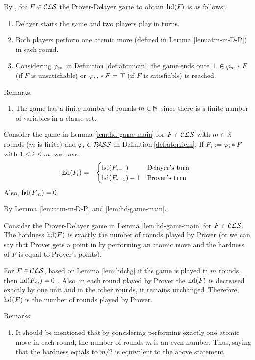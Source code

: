 \documentclass{report}
\begin{document}
\begin{lem}\label{lem:hd-game-main}
By \cite{BeyersdorffKullmann2014PHP}, for $F \in \mathcal{CLS}$ the Prover-Delayer game to obtain $\operatorname{hd}(F)$ is as follows:
  \begin{enumerate}
  \item Delayer starts the game and two players play in turns.
  \item Both players perform one atomic move (defined in Lemma \ref{lem:atm-m-D-P}) in each round.
  \item Considering $\varphi_m$ in Definition \ref{def:atomicm}, the game ends once $\bot \in \varphi_m * F $ (if $F$ is unsatisfiable) or $\varphi_m * F=\top$ (if $F$ is satisfiable) is reached. 
  \end{enumerate}
\end{lem}
Remarks:
  \begin{enumerate}
  \item The game has a finite number of rounds $m \in \mathbb{N}$ since there is a finite number of variables in a clause-set. 
  \end{enumerate}

\begin{lem}\label{lem:hdchg}
Consider the game in Lemma \ref{lem:hd-game-main} for $F \in \mathcal{CLS}$ with $m \in  \mathbb{N}$ rounds ($m$ is finite) and $\varphi_i \in \mathcal{P\hspace{-0.32em}ASS}$ in Definition \ref{def:atomicm}. If $F_i:= \varphi_i * F$ with $1 \le i \le m$, we have:
  \begin{eqnarray*}
  \operatorname{hd}(F_i) & = &
  \begin{cases}
  \operatorname{hd}(F_{i-1}) & \text{Delayer's turn }\\ \operatorname{hd}(F_{i-1})-1 & \text{Prover's turn}
  \end{cases}
  \end{eqnarray*}
Also, $\operatorname{hd}(F_m)=0$.
\end{lem}
\begin{prf}
By Lemma \ref{lem:atm-m-D-P} and \ref{lem:hd-game-main}.
\end{prf}

\begin{lem}\label{lem:gameres1}
Consider the Prover-Delayer game in Lemma \ref{lem:hd-game-main} for $F \in \mathcal{CLS}$. The hardness $\operatorname{hd}(F)$ is exactly the number of rounds played by Prover (or we can say that Prover gets a point in by performing an atomic move and the hardness of $F$ is equal to Prover's points).
\end{lem}
\begin{prf}
For $F \in \mathcal{CLS}$, based on Lemma \ref{lem:hdchg} if the game is played in $m$ rounds, then $\operatorname{hd}(F_m)=0$ . Also, in each round played by Prover the $\operatorname{hd}(F)$ is decreased exactly by one unit and in the other rounds, it remains unchanged. Therefore, $\operatorname{hd}(F)$ is the number of rounds played by Prover.
\end{prf}
Remarks:
  \begin{enumerate}
  \item It should be mentioned that by considering performing exactly one atomic move in each round, the number of rounds $m$ is an even number. Thus, saying that the hardness equals to $m / 2$ is equivalent to the above statement.
  \end{enumerate}
\end{document}

